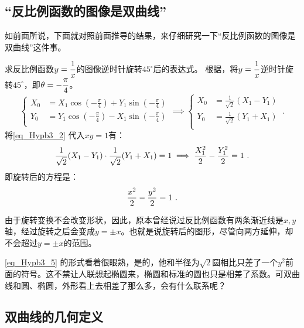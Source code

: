 \subsection{“反比例函数的图像是双曲线”}

如前面所说，下面就对照前面推导的结果，来仔细研究一下“反比例函数的图像是双曲线”这件事。

\begin{example}{求反比例函数$\displaystyle y={1\over x}$的图像逆时针旋转$45^\circ$后的表达式。}
根据，将$\displaystyle y={1\over x}$逆时针旋转$45^\circ$，即$\displaystyle\theta=-{\pi\over4}$。
\begin{equation}\label{eq_Hypb3_2}
\begin{cases}
\displaystyle
X_0&=X_1 \cos \left(-{\displaystyle\frac{\pi}{4}}\right) + Y_1 \sin  \left(-{\displaystyle\frac{\pi}{4}}\right)\\
Y_0&=Y_1 \cos  \left(-{\displaystyle\frac{\pi}{4}}\right) - X_1 \sin  \left(-{\displaystyle\frac{\pi}{4}}\right)\\
\end{cases}\implies
\begin{cases}
X_0&={\displaystyle\frac{1}{\sqrt{2}}}(X_1 - Y_1)\\
Y_0&={\displaystyle\frac{1}{\sqrt{2}}}(Y_1+ X_1) \\
\end{cases}~.
\end{equation}
将\autoref{eq_Hypb3_2} 代入$xy=1$有：
\begin{equation}
\displaystyle
{1\over\sqrt{2}}(X_1 - Y_1)\cdot{1\over\sqrt{2}}(Y_1+ X_1)=1\implies {X_1^2\over2}- {Y_1^2\over2}=1~.
\end{equation}
即旋转后的方程是：
\begin{equation}\label{eq_Hypb3_5}
{x^2\over2}- {y^2\over2}=1~.
\end{equation}
\end{example}

由于旋转变换不会改变形状，因此，原本曾经说过反比例函数有两条渐近线是$x,y$轴，经过旋转之后会变成$y=\pm x$。也就是说旋转后的图形，尽管向两方延伸，却不会超过$y=\pm x$的范围。

\autoref{eq_Hypb3_5} 的形式看着很眼熟，是的，他和半径为$\sqrt{2}$圆相比只差了一个$y^2$前面的符号。这不禁让人联想起椭圆来，椭圆和标准的圆也只是相差了系数。可双曲线和圆、椭圆，外形看上去相差了那么多，会有什么联系呢？


\subsection{双曲线的几何定义}

